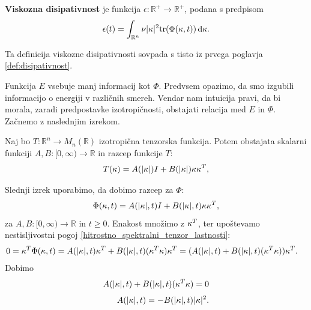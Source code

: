 \documentclass[mat2, tisk]{fmfdelo}
\newcommand{\R}{\mathbb R}
\newcommand{\bd}{\textbf}
\begin{document}
\begin{definicija}
\bd{Viskozna disipativnost} je funkcija $\epsilon: \R^+ \rightarrow \R^+$, podana s predpisom
\begin{equation*}
\epsilon(t) = \int_{\R^n} \nu |\bd{\text{$\kappa$}}|^2 \text{tr}(\Phi(\bd{\text{$\kappa$}}, t)) \dif \bd{\text{$\kappa$}}.
\end{equation*}
\end{definicija}

\begin{opomba}
Ta definicija viskozne disipativnosti sovpada s tisto iz 
prvega poglavja \eqref{def:disipativnost}.
\end{opomba}

Funkcija $E$ vsebuje manj informacij kot $\Phi$. Predvsem opazimo, 
da smo izgubili informacijo o energiji v različnih smereh. Vendar nam intuicija pravi, 
da bi morala, zaradi predpostavke izotropičnosti, obstajati relacija med 
$E$ in $\Phi$. Začnemo z naslednjim izrekom.
\begin{izrek}
Naj bo $T: \R^n \rightarrow M_n(\R)$ izotropična tenzorska funkcija. 
Potem obstajata skalarni funkciji $A, B: [0, \infty) \rightarrow \R$ in razcep 
funkcije $T$: 
\begin{equation*}
T(\text{\bd{$\kappa$}}) = A(|\text{\bd{$\kappa$}}|) I + B(|\text{\bd{$\kappa$}}|) \text{\bd{$\kappa$}} \text{\bd{$\kappa$}}^T,
\end{equation*}
\end{izrek}

Slednji izrek uporabimo, da dobimo razcep za $\Phi$:
\begin{equation*}
\Phi(\text{\bd{$\kappa$}}, t) = A(|\text{\bd{$\kappa$}}|, t) I + B(|\text{\bd{$\kappa$}}|, t) \text{\bd{$\kappa$}} \text{\bd{$\kappa$}}^T,
\end{equation*}
za $A, B: [0, \infty) \rightarrow \R$ in $t\geq 0$. Enakost množimo z 
$\text{\bd{$\kappa$}}^T$, ter upoštevamo nestisljivostni pogoj \eqref{hitrostno_spektralni_tenzor_lastnosti}:
\begin{align*}
0 = \text{\bd{$\kappa$}}^T \Phi(\text{\bd{$\kappa$}}, t) &= A(|\text{\bd{$\kappa$}}|, t) \text{\bd{$\kappa$}}^T  + B(|\text{\bd{$\kappa$}}|, t) (\text{\bd{$\kappa$}}^T \text{\bd{$\kappa$}}) \text{\bd{$\kappa$}}^T = (A(|\text{\bd{$\kappa$}}|, t)  + B(|\text{\bd{$\kappa$}}|, t) (\text{\bd{$\kappa$}}^T \text{\bd{$\kappa$}})) \text{\bd{$\kappa$}}^T.
\end{align*}
Dobimo
\begin{align*}
A(|\text{\bd{$\kappa$}}|, t)  + B(|\text{\bd{$\kappa$}}|, t) (\text{\bd{$\kappa$}}^T \text{\bd{$\kappa$}}) = 0 \\[1mm]
A(|\text{\bd{$\kappa$}}|, t) = -B(|\text{\bd{$\kappa$}}|, t) |\text{\bd{$\kappa$}}|^2.
\end{align*}
\end{document}
